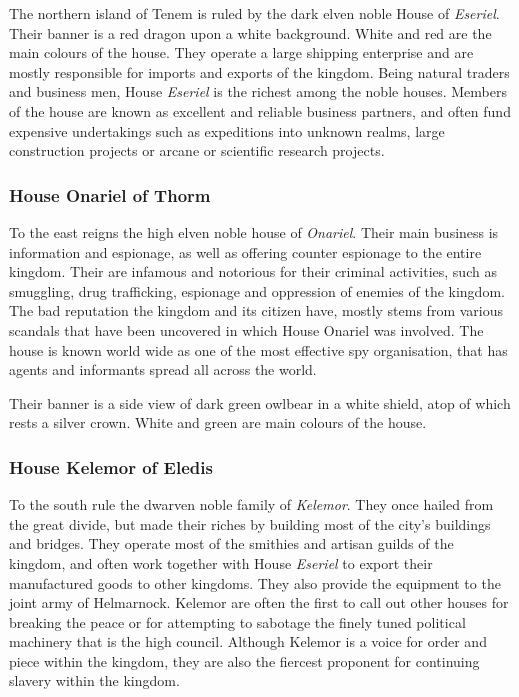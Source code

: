 The northern island of Tenem is ruled by the dark elven noble House of
\emph{Eseriel}. Their banner is a red dragon upon a white background. White
and red are the main colours of the house. They operate a large shipping
enterprise and are mostly responsible for imports and exports of the
kingdom. Being natural traders and business men, House \emph{Eseriel} is the
richest among the noble houses. Members of the house are known as excellent
and reliable business partners, and often fund expensive undertakings such
as expeditions into unknown realms, large construction projects or arcane
or scientific research projects.

\subsubsection*{House Onariel of Thorm}
\label{sec:House Onariel}

To the east reigns the high elven noble house of \emph{Onariel}. Their main
business is information and espionage, as well as offering counter espionage
to the entire kingdom. Their are infamous and notorious for their criminal
activities, such as smuggling, drug trafficking, espionage and oppression
of enemies of the kingdom. The bad reputation the kingdom and its citizen
have, mostly stems from various scandals that have been uncovered in which
House Onariel was involved. The house is known world wide as one of the most
effective spy organisation, that has agents and informants spread all across
the world.

Their banner is a side view of dark green owlbear in a white shield, atop of
which rests a silver crown. White and green are main colours of the house.

\subsubsection*{House Kelemor of Eledis}
\label{sec:House Kelemor}

To the south rule the dwarven noble family of \emph{Kelemor}. They once
hailed from the great divide, but made their riches by building most of
the city's buildings and bridges. They operate most of the smithies and
artisan guilds of the kingdom, and often work together with House
\emph{Eseriel} to export their manufactured goods to other kingdoms.
They also provide the equipment to the joint army of Helmarnock. Kelemor
are often the first to call out other houses for breaking the peace or
for attempting to sabotage the finely tuned political machinery that
is the high council. Although Kelemor is a voice for order and piece within
the kingdom, they are also the fiercest proponent for continuing slavery
within the kingdom.

